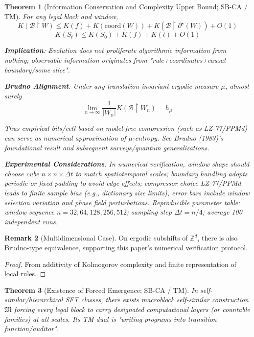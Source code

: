\documentclass[12pt]{article}
\theoremstyle{plain}
\newtheorem{theorem}{Theorem}[section]
\theoremstyle{definition}
\newtheorem{remark}[theorem]{Remark}
\begin{document}
\begin{theorem}[Information Conservation and Complexity Upper Bound; SB-CA / TM]
For any legal block and window,
\[
K(\mathcal{B} \upharpoonright W) \le K(f) + K(\mathrm{coord}(W)) + K(\mathcal{B} \upharpoonright \partial^\star(W)) + O(1)
\]
\[
K(S_t) \le K(S_0) + K(f) + K(t) + O(1)
\]

\textbf{Implication}: Evolution does not proliferate algorithmic information from nothing; observable information originates from "rule+coordinates+causal boundary/some slice".

\textbf{Brudno Alignment}: Under any translation-invariant ergodic measure $\mu$, almost surely
\[
\lim_{n\to\infty}\frac{1}{|W_n|}K(\mathcal{B} \upharpoonright W_n)=h_\mu
\]

Thus empirical bits/cell based on model-free compression (such as LZ-77/PPMd) can serve as numerical approximation of $\mu$-entropy. See Brudno (1983)\cite{brudno1983}'s foundational result and subsequent surveys/quantum generalizations.

\textbf{Experimental Considerations}: In numerical verification, window shape should choose cube $n \times n \times \Delta t$ to match spatiotemporal scales; boundary handling adopts periodic or fixed padding to avoid edge effects; compressor choice LZ-77/PPMd leads to finite sample bias (e.g., dictionary size limits), error bars include window selection variation and phase field perturbations. Reproducible parameter table: window sequence $n = 32, 64, 128, 256, 512$; sampling step $\Delta t = n/4$; average 100 independent runs.
\end{theorem}

\begin{remark}[Multidimensional Case]
On ergodic subshifts of $\mathbb{Z}^d$, there is also Brudno-type equivalence, supporting this paper's numerical verification protocol.
\end{remark}

\begin{proof}
From additivity of Kolmogorov complexity and finite representation of local rules.
\end{proof}

\begin{theorem}[Existence of Forced Emergence; SB-CA / TM]
In self-similar/hierarchical SFT classes, there exists macroblock self-similar construction $\mathfrak{M}$ forcing every legal block to carry designated computational layers (or countable families) at all scales. Its TM dual is "writing programs into transition function/auditor".
\end{theorem}
\end{document}

